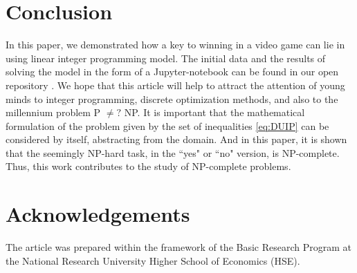 \documentclass[smallextended]{svjour3}       %
\begin{document}
\section{Conclusion}
\label{SectionConclusion}
In this paper, we demonstrated how a key to winning in a video game can lie in using linear integer  programming model.
The initial data and the results of solving the model in the form of a Jupyter-notebook can be found in our open repository \cite{UnderLordsInput}.
We hope that this article will help to attract the attention of young minds to integer programming, discrete optimization methods, and also to the millennium problem P $ \neq? $ NP.
It is important that the mathematical formulation of the problem given by the set of inequalities \eqref{eq:DUIP} can be considered by itself, abstracting from the domain. And in this paper, it is shown that the seemingly NP-hard task, in the ``yes" or ``no" version, is NP-complete.
Thus, this work contributes to the study of NP-complete problems.

\section{Acknowledgements}

The article was prepared within the framework of the Basic Research Program at the National Research University Higher School of Economics (HSE).



\end{document}
